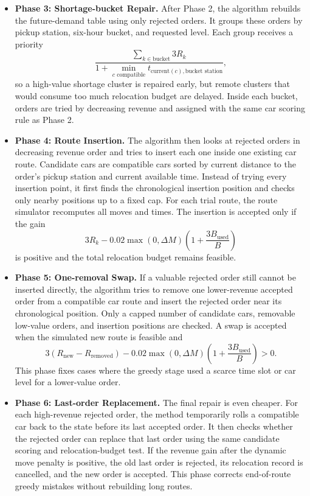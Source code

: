 \documentclass[10pt,a4paper]{article}
\begin{document}
\begin{itemize}
    \item \textbf{Phase 3: Shortage-bucket Repair.} After Phase 2, the algorithm
    rebuilds the future-demand table using only rejected orders.  It groups
    these orders by pickup station, six-hour bucket, and requested level.  Each
    group receives a priority
    \[
    \frac{\sum_{k\in \text{bucket}}3R_k}
    {1+\min_{c\text{ compatible}}t_{\text{current}(c),\text{bucket station}}},
    \]
    so a high-value shortage cluster is repaired early, but remote clusters that
    would consume too much relocation budget are delayed.  Inside each bucket,
    orders are tried by decreasing revenue and assigned with the same car
    scoring rule as Phase 2.

    \item \textbf{Phase 4: Route Insertion.} The algorithm then looks at
    rejected orders in decreasing revenue order and tries to insert each one
    inside one existing car route.  Candidate cars are compatible cars sorted by
    current distance to the order's pickup station and current available time.
    Instead of trying every insertion point, it first finds the chronological
    insertion position and checks only nearby positions up to a fixed cap.  For
    each trial route, the route simulator recomputes all moves and times.  The
    insertion is accepted only if the gain
    \[
    3R_k - 0.02\max(0,\Delta M)\left(1+\frac{3B_{\text{used}}}{B}\right)
    \]
    is positive and the total relocation budget remains feasible.

    \item \textbf{Phase 5: One-removal Swap.} If a valuable rejected order still
    cannot be inserted directly, the algorithm tries to remove one lower-revenue
    accepted order from a compatible car route and insert the rejected order
    near its chronological position.  Only a capped number of candidate cars,
    removable low-value orders, and insertion positions are checked.  A swap is
    accepted when the simulated new route is feasible and
    \[
    3(R_{\text{new}}-R_{\text{removed}})
    -0.02\max(0,\Delta M)\left(1+\frac{3B_{\text{used}}}{B}\right)>0.
    \]
    This phase fixes cases where the greedy stage used a scarce time slot or car
    level for a lower-value order.

    \item \textbf{Phase 6: Last-order Replacement.} The final repair is even
    cheaper.  For each high-revenue rejected order, the method temporarily rolls
    a compatible car back to the state before its last accepted order.  It then
    checks whether the rejected order can replace that last order using the same
    candidate scoring and relocation-budget test.  If the revenue gain after the
    dynamic move penalty is positive, the old last order is rejected, its
    relocation record is cancelled, and the new order is accepted.  This phase
    corrects end-of-route greedy mistakes without rebuilding long routes.


\end{itemize}
\end{document}
